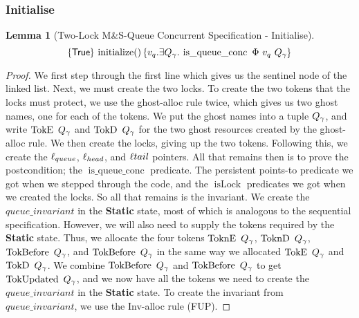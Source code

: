 \documentclass[a4paper, 11pt]{report}
\newtheorem{lemma}[theorem]{Lemma}
\newcommand{\isLock}{\operatorname{isLock}}
\newcommand{\initialise}{\operatorname{initialize}}
\newcommand{\tlmsq}{Two-Lock M\&S-Queue\xspace}
\newcommand{\isqueueconc}{\operatorname{is\_queue\_conc}}
\newcommand{\StaticState}{\textbf{Static}}
\newcommand{\Qg}{Q_\gname}
\newcommand{\TokE}[1]{\operatorname{TokE}\ #1}
\newcommand{\TokEQg}{\TokE{\Qg}}
\newcommand{\ToknE}[1]{\operatorname{ToknE}\ #1}
\newcommand{\ToknEQg}{\ToknE{\Qg}}
\newcommand{\TokD}[1]{\operatorname{TokD}\ #1}
\newcommand{\TokDQg}{\TokD{\Qg}}
\newcommand{\ToknD}[1]{\operatorname{ToknD}\ #1}
\newcommand{\ToknDQg}{\ToknD{\Qg}}
\newcommand{\TokBefore}[1]{\operatorname{TokBefore}\ #1}
\newcommand{\TokBeforeQg}{\TokBefore{\Qg}}
\newcommand{\TokAfterQg}{\TokBefore{\Qg}}
\newcommand{\TokUpdated}[1]{\operatorname{TokUpdated}\ #1}
\newcommand{\TokUpdatedQg}{\TokUpdated{\Qg}}
\newcommand{\tlconcspecinit}{\hoare{\TRUE}{\initialise \TT}{v_q . \Exists Q_\gname. \isqueueconc\ \Phi \ v_q \ Q_\gname}}
\begin{document}
\subsubsection{Initialise}
\begin{lemma}[\tlmsq Concurrent Specification - Initialise]\label{TLMSQ:spec:conc:init}
  \begin{equation*}
    \tlconcspecinit
  \end{equation*}
\end{lemma}
\begin{proof}
We first step through the first line which gives us the sentinel node of the linked list. Next, we must create the two locks. To create the two tokens that the locks must protect, we use the ghost-alloc rule twice, which gives us two ghost names, one for each of the tokens. We put the ghost names into a tuple $\Qg$, and write $\TokEQg$ and $\TokDQg$ for the two ghost resources created by the ghost-alloc rule. We then create the locks, giving up the two tokens. Following this, we create the $\ell_{queue}$, $\ell_{head}$, and $\ell{tail}$ pointers. All that remains then is to prove the postcondition; the $\isqueueconc$ predicate. The persistent points-to predicate we got when we stepped through the code, and the $\isLock$ predicates we got when we created the locks. So all that remains is the invariant. We create the $queue\_invariant$ in the \StaticState{} state, most of which is analogous to the sequential specification. However, we will also need to supply the tokens required by the \StaticState{} state. Thus, we allocate the four tokens $\ToknEQg$, $\ToknDQg$, $\TokBeforeQg$, and $\TokAfterQg$ in the same way we allocated $\TokEQg$ and $\TokDQg$. We combine $\TokBeforeQg$ and $\TokAfterQg$ to get $\TokUpdatedQg$, and we now have all the tokens we need to create the $queue\_invariant$ in the \StaticState{} state. To create the invariant from $queue\_invariant$, we use the Inv-alloc rule (FUP).
\end{proof}
\end{document}
